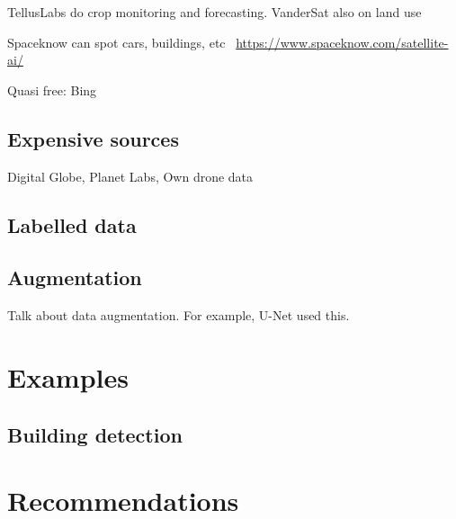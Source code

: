 \documentclass[12pt, a4paper, oneside, headinclude, footinclude]{article}
\begin{document}
TellusLabs do crop monitoring and forecasting. VanderSat also on land use

Spaceknow can spot cars, buildings, etc
~\url{https://www.spaceknow.com/satellite-ai/}

Quasi free: Bing

\subsection{Expensive sources}

Digital Globe, Planet Labs, Own drone data

\subsection{Labelled data}

\subsection{Augmentation}

Talk about data augmentation. For example, U-Net used this.

\section{Examples}

\subsection{Building detection}

\section{Recommendations}


\renewcommand{\refname}{\spacedlowsmallcaps{References}} 





\end{document}
